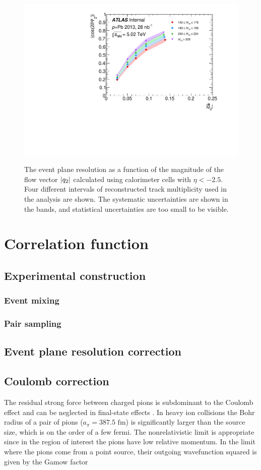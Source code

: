 \begin{figure}[t]
\centering
\includegraphics{epRes.pdf}\\
\caption{The event plane resolution as a function of the magnitude of the flow vector $|q_{2}|$ calculated using calorimeter cells with $\eta < -2.5$. Four different intervals of reconstructed track multiplicity \Nch used in the analysis are shown. The systematic uncertainties are shown in the bands, and statistical uncertainties are too small to be visible.}
\label{fig:ep_res}
\end{figure}


\section{Correlation function}

\subsection{Experimental construction}
\subsubsection{Event mixing}
\subsubsection{Pair sampling}
\subsection{Event plane resolution correction}

\subsection{Coulomb correction}
The residual strong force between charged pions is subdominant to the Coulomb effect and can be neglected in final-state effects \cite{Lednicky:2005tb}.
In heavy ion collisions the Bohr radius of a pair of pions ($a_{\pi} = 387.5 \textrm{ fm}$) is significantly larger than the source size, which is on the order of a few fermi.
The nonrelativistic limit is appropriate since in the region of interest the pions have low relative momentum.
In the limit where the pions come from a point source, their outgoing wavefunction squared is given by the Gamow factor

